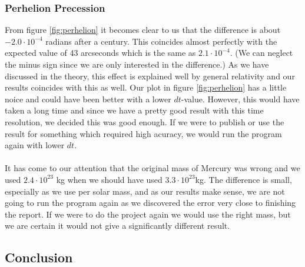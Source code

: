 \documentclass{article}
\newcommand{\E}[1]{\cdot 10^{#1}}
\begin{document}
\subsubsection*{Perhelion Precession}
From figure \ref{fig:perhelion} it becomes clear to us that the difference is about $-2.0\E{-4}$ radians after a century. This coincides almost perfectly with the expected value of 43 arcseconds which is the same as $2.1\E{-4}$. (We can neglect the minus sign since we are only interested in the difference.) As we have discussed in the theory, this effect is explained well by general relativity and our results coincides with this as well. Our plot in figure \ref{fig:perhelion} has a little noice and could have been better with a lower $dt$-value. However, this would have taken a long time and since we have a pretty good result with this time resolution, we decided this was good enough. If we were to publish or use the result for something which required high acuracy, we would run the program again with lower $dt$. \\ \\
It has come to our attention that the original mass of Mercury was wrong and we used $2.4\E{23}$ kg when we should have used $3.3 \E{23}$kg. The difference is small, especially as we use per solar mass, and as our results make sense, we are not going to run the program again as we discovered the error very close to finishing the report. If we were to do the project again we would use the right mass, but we are certain it would not give a significantly different result.
\subsection{Conclusion}

\end{document}
